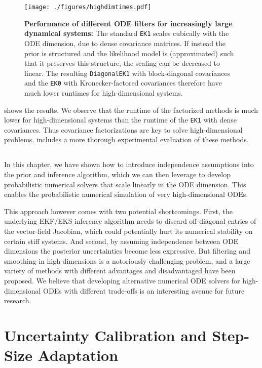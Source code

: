 \documentclass{mimosis}
\begin{document}
\begin{figure}[t]
\centering
\texttt{[image: ./figures/highdimtimes.pdf]}
\caption{\label{fig:highdimtimes}\textbf{Performance of different ODE filters for increasingly large dynamical systems:} The standard \texttt{EK1} scales cubically with the ODE dimension, due to dense covariance matrices. If instead the prior is structured and the likelihood model is (approximated) such that it preserves this structure, the scaling can be decreased to linear. The resulting \texttt{DiagonalEK1} with block-diagonal covariances and the \texttt{EK0} with Kronecker-factored covariances therefore have much lower runtimes for high-dimensional systems.}
\end{figure}

 shows the results.
We observe that the runtime of the factorized methods is much lower for high-dimensional systems than the runtime of the \texttt{EK1} with dense covariances.
Thus covariance factorizations are key to solve high-dimensional problems.
\highdim{}
includes a more thorough experimental evaluation of these methods.
\section{\wrapupsec{}}
\label{sec:orgb90f2e7}
In this chapter, we have shown how to introduce independence assumptions into the prior and inference algorithm, which we can then leverage to develop probabilistic numerical solvers that scale linearly in the ODE dimension.
This enables the probabilistic numerical simulation of very high-dimensional ODEs.

This approach however comes with two potential shortcomings.
First, the underlying \mbox{EKF/EKS} inference algorithm needs to discard off-diagonal entries of the vector-field Jacobian, which could potentially hurt its numerical stability on certain stiff systems.
And second, by assuming independence between ODE dimensions the posterior uncertainties become less expressive.
But filtering and smoothing in high-dimensions is a notoriously challenging problem, and a large variety of methods with different advantages and disadvantaged have been proposed.
We believe that developing alternative numerical ODE solvers for high-dimensional ODEs with different trade-offs is an interesting avenue for future research.
\chapter{Uncertainty Calibration and Step-Size Adaptation}
\label{sec:org0ead8ed}
\label{sec:capos}
\end{document}
